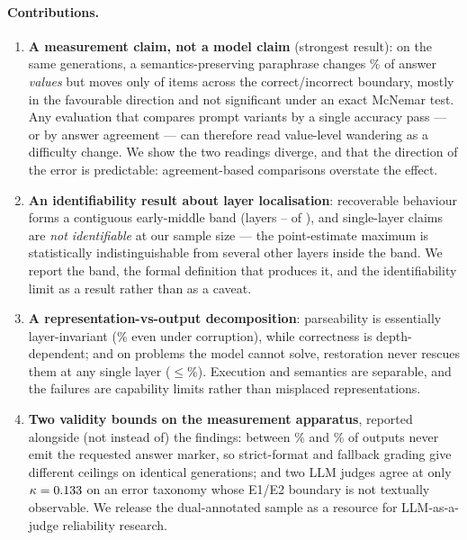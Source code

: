 \documentclass[10pt,letterpaper]{article}
\begin{document}
\paragraph{Contributions.}
\begin{enumerate}
  \item \textbf{A measurement claim, not a model claim} (strongest result): on the
        same generations, a semantics-preserving paraphrase changes
        \pctChangedSevenBWording\% of answer \emph{values} but moves only
        \nbWordingFlips{} of \nbWordingCovered{} items across the
        correct/incorrect boundary, mostly in the favourable direction and not
        significant under an exact McNemar test. Any evaluation that compares
        prompt variants by a single accuracy pass --- or by answer agreement ---
        can therefore read value-level wandering as a difficulty change. We show
        the two readings diverge, and that the direction of the error is
        predictable: agreement-based comparisons overstate the effect.
  \item \textbf{An identifiability result about layer localisation}: recoverable
        behaviour forms a contiguous early-middle band (layers
        \plateauLo--\plateauHi{} of \nbLayers), and single-layer claims are
        \emph{not identifiable} at our sample size --- the point-estimate maximum
        is statistically indistinguishable from several other layers inside the
        band. We report the band, the formal definition that produces it, and the
        identifiability limit as a result rather than as a caveat.
  \item \textbf{A representation-vs-output decomposition}: parseability is
        essentially layer-invariant (\pctParseCorrupt\% even under corruption),
        while correctness is depth-dependent; and on problems the model cannot
        solve, restoration never rescues them at any single layer
        ($\leq$\pctAccCleanWrongBest\%). Execution and semantics are separable,
        and the failures are capability limits rather than misplaced
        representations.
  \item \textbf{Two validity bounds on the measurement apparatus}, reported
        alongside (not instead of) the findings: between \pctNoAnswerCot\% and
        \pctNoAnswerStruct\% of outputs never emit the requested answer marker, so
        strict-format and fallback grading give different ceilings on identical
        generations; and two LLM judges agree at only
        $\kappa=0.133$ on an error taxonomy whose E1/E2 boundary is not
        textually observable. We release the dual-annotated sample as a resource
        for LLM-as-a-judge reliability research.
\end{enumerate}
\end{document}
